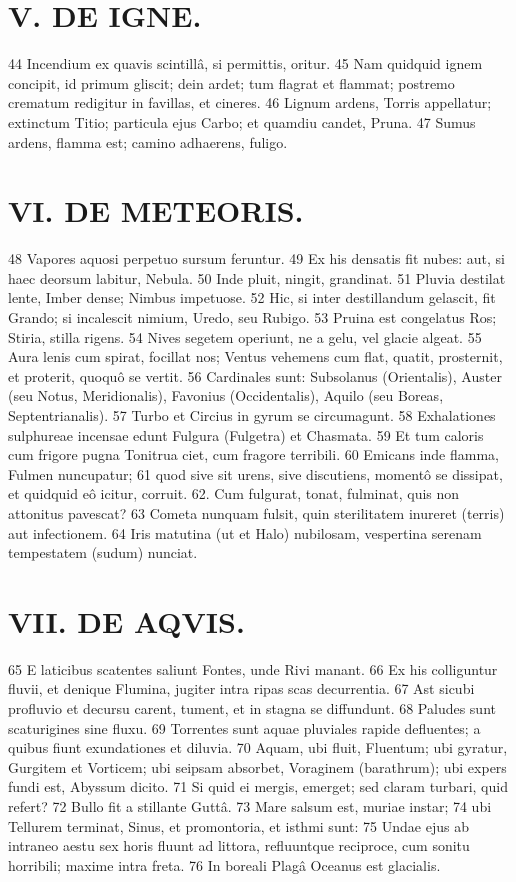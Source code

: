 \section*{V. DE IGNE.}
44 Incendium ex quavis scintillâ, si permittis, oritur. 45 Nam quidquid ignem concipit, id primum gliscit; dein ardet; tum flagrat et flammat; postremo crematum redigitur in favillas, et cineres. 46 Lignum ardens, Torris appellatur; extinctum Titio; particula ejus Carbo; et quamdiu candet, Pruna. 47 Sumus ardens, flamma est; camino adhaerens, fuligo.

\section*{VI. DE METEORIS.}
48 Vapores aquosi perpetuo sursum feruntur. 49 Ex his densatis fit nubes: aut, si haec deorsum labitur, Nebula. 50 Inde pluit, ningit, grandinat. 51 Pluvia destilat lente, Imber dense; Nimbus impetuose. 52 Hic, si inter destillandum gelascit, fit Grando; si incalescit nimium, Uredo, seu Rubigo. 53 Pruina est congelatus Ros; Stiria, stilla rigens. 54 Nives segetem operiunt, ne a gelu, vel glacie algeat. 55 Aura lenis cum spirat, focillat nos; Ventus vehemens cum flat, quatit, prosternit, et proterit, quoquô se vertit. 56 Cardinales sunt: Subsolanus (Orientalis), Auster (seu Notus, Meridionalis), Favonius (Occidentalis), Aquilo (seu Boreas, Septentrianalis). 57 Turbo et Circius in gyrum se circumagunt. 58 Exhalationes sulphureae incensae edunt Fulgura (Fulgetra) et Chasmata. 59 Et tum caloris cum frigore pugna Tonitrua ciet, cum fragore terribili. 60 Emicans inde flamma, Fulmen nuncupatur; 61 quod sive sit urens, sive discutiens, momentô se dissipat, et quidquid eô icitur, corruit. 62. Cum fulgurat, tonat, fulminat, quis non attonitus pavescat? 63 Cometa nunquam fulsit, quin sterilitatem inureret (terris) aut infectionem. 64 Iris matutina (ut et Halo) nubilosam, vespertina serenam tempestatem (sudum) nunciat.

\section*{VII. DE AQVIS.}
65 E laticibus scatentes saliunt Fontes, unde Rivi manant. 66 Ex his colliguntur fluvii, et denique Flumina, jugiter intra ripas scas decurrentia. 67 Ast sicubi profluvio et decursu carent, tument, et in stagna se diffundunt. 68 Paludes sunt scaturigines sine fluxu. 69 Torrentes sunt aquae pluviales rapide defluentes; a quibus fiunt exundationes et diluvia. 70 Aquam, ubi fluit, Fluentum; ubi gyratur, Gurgitem et Vorticem; ubi seipsam absorbet, Voraginem (barathrum); ubi expers fundi est, Abyssum dicito. 71 Si quid ei mergis, emerget; sed claram turbari, quid refert? 72 Bullo fit a stillante Guttâ. 73 Mare salsum est, muriae instar; 74 ubi Tellurem terminat, Sinus, et promontoria, et isthmi sunt: 75 Undae ejus ab intraneo aestu sex horis fluunt ad littora, refluuntque reciproce, cum sonitu horribili; maxime intra freta. 76 In boreali Plagâ Oceanus est glacialis.

